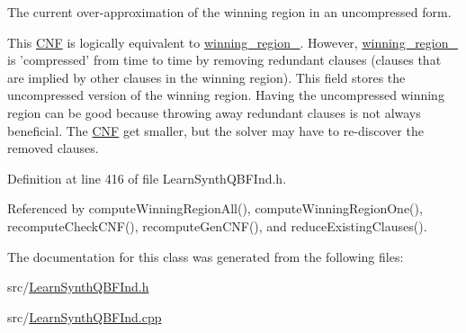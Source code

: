 The current over-\/approximation of the winning region in an uncompressed form. 

This \hyperlink{classCNF}{C\-N\-F} is logically equivalent to \hyperlink{classLearnSynthQBFInd_ab8ce6031137413e90e0626bbdc734be0}{winning\-\_\-region\-\_\-}. However, \hyperlink{classLearnSynthQBFInd_ab8ce6031137413e90e0626bbdc734be0}{winning\-\_\-region\-\_\-} is 'compressed' from time to time by removing redundant clauses (clauses that are implied by other clauses in the winning region). This field stores the uncompressed version of the winning region. Having the uncompressed winning region can be good because throwing away redundant clauses is not always beneficial. The \hyperlink{classCNF}{C\-N\-F} get smaller, but the solver may have to re-\/discover the removed clauses. 

Definition at line 416 of file Learn\-Synth\-Q\-B\-F\-Ind.\-h.



Referenced by compute\-Winning\-Region\-All(), compute\-Winning\-Region\-One(), recompute\-Check\-C\-N\-F(), recompute\-Gen\-C\-N\-F(), and reduce\-Existing\-Clauses().



The documentation for this class was generated from the following files\-:\begin{DoxyCompactItemize}
\item 
src/\hyperlink{LearnSynthQBFInd_8h}{Learn\-Synth\-Q\-B\-F\-Ind.\-h}\item 
src/\hyperlink{LearnSynthQBFInd_8cpp}{Learn\-Synth\-Q\-B\-F\-Ind.\-cpp}\end{DoxyCompactItemize}
